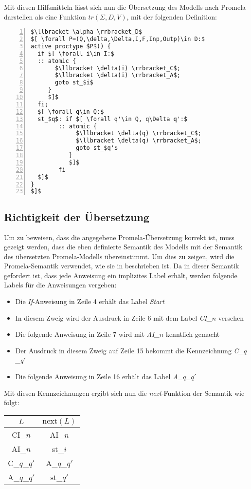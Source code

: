 Mit diesen Hilfsmitteln lässt sich nun die Übersetzung des Modells nach Promela darstellen als eine Funktion $tr(\Sigma,D,V)$, mit der folgenden Definition:
\begin{lstlisting}[language=Promela,mathescape=true,numbers=left,numberstyle=\small]
$\llbracket \alpha \rrbracket_D$
$[ \forall P=(Q,\delta,\Delta,I,F,Inp,Outp)\in D:$
active proctype $P$() {
  if $[ \forall i\in I:$
  :: atomic {
       $\llbracket \delta(i) \rrbracket_C$;
       $\llbracket \delta(i) \rrbracket_A$;
       goto st_$i$
     }
     $]$
  fi;
  $[ \forall q\in Q:$
  st_$q$: if $[ \forall q'\in Q, q\Delta q':$
        :: atomic {
             $\llbracket \delta(q) \rrbracket_C$;
             $\llbracket \delta(q) \rrbracket_A$;
             goto st_$q'$
           }
           $]$
        fi
  $]$
}
$]$
\end{lstlisting}
\subsection{Richtigkeit der Übersetzung}
Um zu beweisen, dass die angegebene Promela-Übersetzung korrekt ist, muss gezeigt werden, dass die eben definierte Semantik des Modells mit der Semantik des übersetzten Promela-Modells übereinstimmt.
Um dies zu zeigen, wird die Promela-Semantik verwendet, wie sie in \cite{Gallardo04formalaspects} beschrieben ist.
Da in dieser Semantik gefordert ist, dass jede Anweisung ein implizites Label erhält, werden folgende Labels für die Anweisungen vergeben:
\begin{itemize}
\item Die \emph{If}-Anweisung in Zeile 4 erhält das Label \emph{Start}
\item In diesem Zweig wird der Ausdruck in Zeile 6 mit dem Label \emph{CI_$n$} versehen
\item Die folgende Anweisung in Zeile 7 wird mit \emph{AI_$n$} kenntlich gemacht
\item Der Ausdruck in diesem Zweig auf Zeile 15 bekommt die Kennzeichnung \emph{C_$q$_$q'$}
\item Die folgende Anweisung in Zeile 16 erhält das Label \emph{A_$q$_$q'$}
\end{itemize}

Mit diesen Kennzeichnungen ergibt sich nun die \emph{next}-Funktion der Semantik wie folgt:

\begin{tabular}{|c|c|}
  \hline
  $L$ & $\textrm{next}(L)$\\
  \hline
  CI_$n$ & AI_$n$\\
  AI_$n$ & st_$i$\\
  C_$q$_$q'$ & A_$q$_$q'$\\
  A_$q$_$q'$ & st_$q'$\\
  \hline
\end{tabular}

